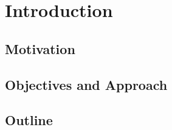 \cleardoubleoddpage%
\chapter{Introduction}


\section{Motivation}



\section{Objectives and Approach}


\section{Outline}



